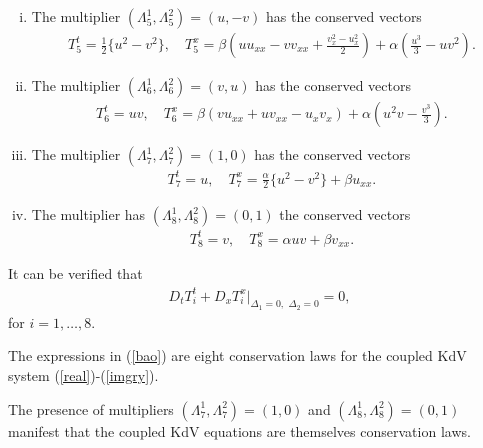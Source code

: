 \begin{enumerate}[(i)]
\item  The multiplier $ \left( \Lambda_{5}^1, \Lambda_{5}^2\right)= \left(u , -v\right)$ has the  conserved vectors 
\begin{align}
 T^t_5= \frac{1}{2}\{ u^2-v^2\},\quad
 T^x_5=\beta \left( u u_{xx} -v v_{xx} + \frac{ v_x^2-u_x^2}{2} \right)  +  \alpha \left(\frac{u^3}{3} - uv^2 \right).
\end{align}

\item  The multiplier $ \left( \Lambda_{6}^1, \Lambda_{6}^2\right)= \left(v, u\right)$ has the  conserved vectors 
\begin{align}
 T^t_6= uv,\quad
T^x_6= \beta \left( v u_{xx} +u v_{xx} -u_x v_x \right) + \alpha \left( u^2 v-  \frac{  v^3}{3} \right).
\end{align}
 \item The multiplier  $  \left( \Lambda_{7}^1, \Lambda_{7}^2\right)= \left( 1,0\right)$
 has the  conserved vectors 
 \begin{align}
 T_7^t=u,\quad
 T_7^x= \frac{\alpha}{2} \{ u^2-v^2\}+ \beta u_{xx}.
 \end{align}
\item The multiplier has  $ \left( \Lambda_{8}^1, \Lambda_{8}^2\right)= \left( 0,1\right) $ the conserved vectors 
\begin{align}
T_8^t=v,\quad
T_8^x=\alpha uv+ \beta v_{xx}.
\end{align}
\end{enumerate}
\begin{rem}
It can be verified that \begin{align}
D_t T^t_i + D_xT^x_i \Big |_{\Delta_1=0, \,\,\Delta_2=0}=0, \label{bao}
\end{align} for $i =1,\ldots,8$.
\end{rem}
\begin{rem}
The expressions in (\ref{bao}) are  eight conservation laws for the coupled KdV system (\ref{real})-(\ref{imgry}).
\end{rem}
\begin{rem}
The presence of multipliers $\left( \Lambda_{7}^1, \Lambda_{7}^2\right)= \left( 1,0\right)$ and $\left( \Lambda_{8}^1, \Lambda_{8}^2\right)= \left( 0,1\right)$ manifest that the coupled KdV equations are themselves conservation laws.
\end{rem}
